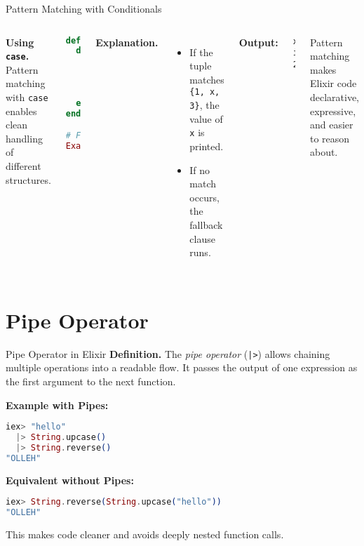\documentclass[aspectratio=169, table]{beamer}
\begin{document}
\begin{frame}[fragile]{Pattern Matching with Conditionals}
\vspace{20pt}
\begin{columns}[t]

\textbf{Using \texttt{case}.}  
Pattern matching with \texttt{case} enables clean handling of different structures.

\begin{lstlisting}[language=Elixir]
defmodule Example do
  def match_pattern(tuple) do
    case tuple do
      {1, x, 3} -> IO.puts("x is #{x}")
      _ -> IO.puts("No match found")
    end
  end
end

# Function call
Example.match_pattern({1, 2, 3})
\end{lstlisting}

\textbf{Explanation.}  
\begin{itemize}
  \item If the tuple matches \texttt{\{1, x, 3\}},  
        the value of \texttt{x} is printed.  
  \item If no match occurs, the fallback clause runs.  
\end{itemize}

\textbf{Output:}
\begin{verbatim}
x is 2
\end{verbatim}

Pattern matching makes Elixir code declarative,  
expressive, and easier to reason about.
\end{columns}
\end{frame}

\section{Pipe Operator}

\begin{frame}[fragile]{Pipe Operator in Elixir}
\vspace{20pt}
\textbf{Definition.}  
The \textit{pipe operator} (\texttt{|>}) allows chaining multiple operations  
into a readable flow. It passes the output of one expression  
as the first argument to the next function.

\textbf{Example with Pipes:}
\begin{lstlisting}[language=Elixir]
iex> "hello"
  |> String.upcase()
  |> String.reverse()
"OLLEH"
\end{lstlisting}

\textbf{Equivalent without Pipes:}
\begin{lstlisting}[language=Elixir]
iex> String.reverse(String.upcase("hello"))
"OLLEH"
\end{lstlisting}

This makes code cleaner and avoids deeply nested function calls.
\end{frame}
\end{document}
